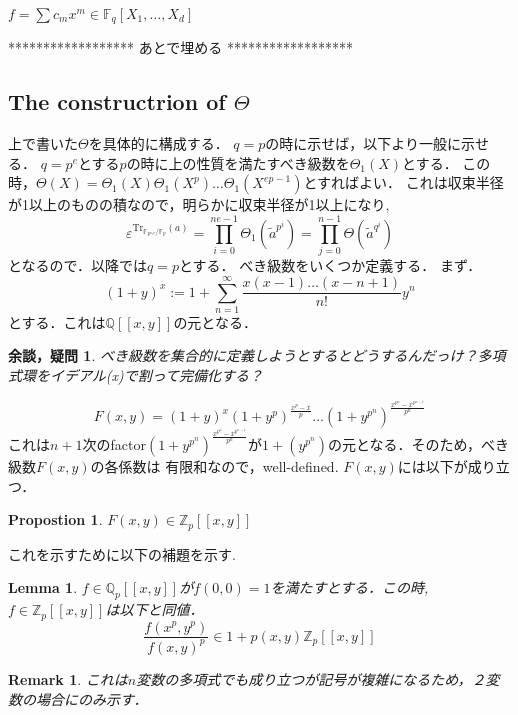 \documentclass{ujarticle}
\newtheorem{prop}[thm]{Propostion}
\newtheorem{lem}[thm]{Lemma}
\newtheorem*{rem}{Remark}
\newtheorem*{yodan}{余談，疑問}
\begin{document}
$f=\sum c_mx^m \in \mathbb{F}_q[X_1,\dots,X_d]$

******************
 あとで埋める
******************


\subsection{The constructrion of $\Theta$}
\label{sub:The constructrion of }
上で書いた$\Theta$を具体的に構成する．
$q=p$の時に示せば，以下より一般に示せる．
$q=p^e$とする$p$の時に上の性質を満たすべき級数を$\Theta_1(X)$とする．
この時，$\Theta(X)=\Theta_1(X)\Theta_1(X^p)\dots\Theta_1(X^{ep-1})$とすればよい．
これは収束半径が1以上のものの積なので，明らかに収束半径が1以上になり,
\begin{equation*}
 \varepsilon^{\mathrm{Tr}_{\mathbb{F}_{p^ne}/\mathbb{F}_p}(a)}=
 \prod_{i=0}^{ne-1} \Theta_1(\tilde{a}^{p^i})　 =
 \prod_{j=0}^{n-1}\Theta(\tilde{a}^{q^i})
\end{equation*}
となるので．以降では$q=p$とする．
べき級数をいくつか定義する．
まず．
\begin{equation*}
 (1+y)^x:=1+\sum_{n=1}^{\infty}\frac{x(x-1)\dots(x-n+1)}{n!}y^n
\end{equation*}
とする．これは$\mathbb{Q}[[x,y]]$の元となる．
\begin{yodan}
 べき級数を集合的に定義しようとするとどうするんだっけ？多項式環をイデアル(x)で割って完備化する？
\end{yodan}

\begin{equation*}
 F(x,y)=(1+y)^x(1+y^p)^{\frac{x^p-x}{p}} \dots ({1+y^{p^n}})^{\frac{x^{p^n}-x^{p^{n-1}}}{p^n}}
\end{equation*}
これは$n+1$次のfactor$({1+y^{p^n}})^{\frac{x^{p^n}-x^{p^{n-1}}}{p^n}}$が$1+(y^{p^n})$の元となる．そのため，べき級数$F(x,y)$の各係数は
有限和なので，well-defined.
$F(x,y)$には以下が成り立つ．
\begin{prop}
 $F(x,y)\in \mathbb{Z}_p[[x,y]]$
\end{prop}
これを示すために以下の補題を示す.

\begin{lem}
 $f \in \mathbb{Q}_p[[x,y]]$が$f(0,0)=1$を満たすとする．この時,$f \in \mathbb{Z}_p[[x,y]]$は以下と同値．
 \begin{equation*}
  \frac{f(x^p,y^p)}{f(x,y)^p} \in 1 + p(x,y)\mathbb{Z}_p[[x,y]]
 \end{equation*}
\end{lem}
\begin{rem}
 これは$n$変数の多項式でも成り立つが記号が複雑になるため，２変数の場合にのみ示す．
\end{rem}
\end{document}
